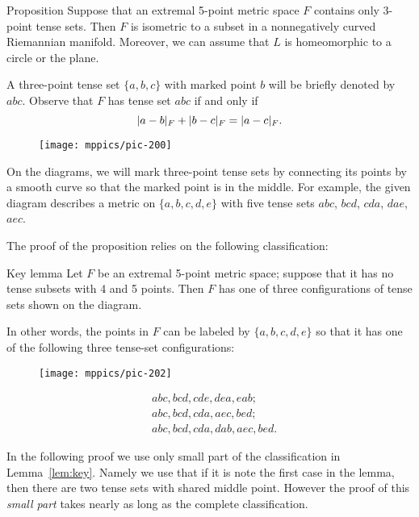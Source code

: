 \documentclass{article}
\begin{document}
\begin{thm}{Proposition}\label{prop:3-tense}
Suppose that an extremal 5-point metric space $F$ contains only 3-point tense sets.
Then $F$ is isometric to a subset in a nonnegatively curved Riemannian manifold.
Moreover, we can assume that $L$ is homeomorphic to a circle or the plane.
\end{thm}

A three-point tense set $\{a,b,c\}$ with marked point $b$ will be briefly denoted by $abc$.
Observe that $F$ has tense set $abc$ if and only if 
\[|a-b|_F+|b-c|_F\z=|a-c|_F.\]

\begin{wrapfigure}{r}{20mm}
\vskip-0mm
\centering
\texttt{[image: mppics/pic-200]}
\end{wrapfigure}

On the diagrams, we will mark three-point tense sets by connecting its points by a smooth curve so that the marked point is in the middle.
For example, the given diagram describes a metric on $\{a,b,c,d,e\}$ with five tense sets $abc$, $bcd$, $cda$, $dae$, $aec$.

The proof of the proposition relies on the following classification:

\begin{thm}{Key lemma}\label{lem:key}
Let $F$ be an extremal 5-point metric space; suppose that it has no tense subsets with 4 and 5 points.
Then $F$ has one of three configurations of tense sets shown on the diagram.

In other words, the points in $F$ can be labeled by $\{a,b,c,d,e\}$ so that it has
one of the following three tense-set configurations:

\begin{wrapfigure}{r}{45mm}
\vskip3mm
\centering
\texttt{[image: mppics/pic-202]}
\end{wrapfigure}
\vskip-6mm
\begin{align*}
&abc, bcd, cde, dea, eab;
\\
&abc, bcd, cda, aec, bed;
\\
&abc, bcd, cda, dab, aec, bed.
\end{align*}

\end{thm}

In the following proof we use only small part of the classification in Lemma~\ref{lem:key}.
Namely we use that if it is note the first case in the lemma, then there are two tense sets with shared middle point.  
However the proof of this \emph{small part} takes nearly as long as the complete classification.
\end{document}
